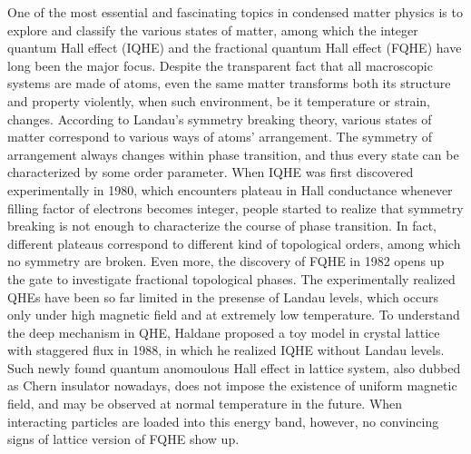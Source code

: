 \begin{englishabstract}
One of the most essential and fascinating topics in condensed matter physics is to explore and classify the various states of matter, among which the integer quantum Hall effect (IQHE) and the fractional quantum Hall effect (FQHE) have long been the major focus. Despite the transparent fact that all macroscopic systems are made of atoms, even the same matter transforms both its structure and property violently, when such environment, be it temperature or strain, changes. According to Landau's symmetry breaking theory, various states of matter correspond to various ways of atoms' arrangement. The symmetry of arrangement always changes within phase transition, and thus every state can be characterized by some order parameter. When IQHE was first discovered experimentally in 1980, which encounters plateau in Hall conductance whenever filling factor of electrons becomes integer, people started to realize that symmetry breaking is not enough to characterize the course of phase transition. In fact, different plateaus correspond to different kind of topological orders, among which no symmetry are broken. Even more, the discovery of FQHE in 1982 opens up the gate to investigate fractional topological phases. The experimentally realized QHEs have been so far limited in the presense of Landau levels, which occurs only under high magnetic field and at extremely low temperature. To understand the deep mechanism in QHE, Haldane proposed a toy model in crystal lattice with staggered flux in 1988, in which he realized IQHE without Landau levels. Such newly found quantum anomoulous Hall effect in lattice system, also dubbed as Chern insulator nowadays, does not impose the existence of uniform magnetic field, and may be observed at normal temperature in the future. When interacting particles are loaded into this energy band, however, no convincing signs of lattice version of FQHE show up.


\end{englishabstract}
